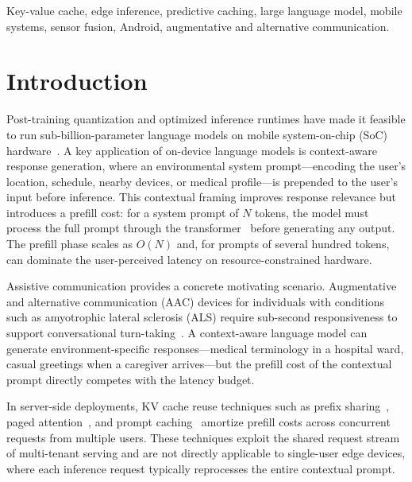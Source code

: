 \documentclass[journal]{IEEEtran}
\begin{document}
\begin{IEEEkeywords}
Key-value cache, edge inference, predictive caching, large language model, mobile systems, sensor fusion, Android, augmentative and alternative communication.
\end{IEEEkeywords}

\section{Introduction}
\label{sec:introduction}

Post-training quantization and optimized inference runtimes have made it feasible to run sub-billion-parameter language models on mobile system-on-chip (SoC) hardware~\cite{dettmers2022,frantar2022,llamacpp}. A key application of on-device language models is context-aware response generation, where an environmental system prompt---encoding the user's location, schedule, nearby devices, or medical profile---is prepended to the user's input before inference. This contextual framing improves response relevance but introduces a prefill cost: for a system prompt of $N$ tokens, the model must process the full prompt through the transformer~\cite{vaswani2017} before generating any output. The prefill phase scales as $O(N)$ and, for prompts of several hundred tokens, can dominate the user-perceived latency on resource-constrained hardware.

Assistive communication provides a concrete motivating scenario. Augmentative and alternative communication (AAC) devices for individuals with conditions such as amyotrophic lateral sclerosis (ALS) require sub-second responsiveness to support conversational turn-taking~\cite{beukelman2020}. A context-aware language model can generate environment-specific responses---medical terminology in a hospital ward, casual greetings when a caregiver arrives---but the prefill cost of the contextual prompt directly competes with the latency budget.

In server-side deployments, KV cache reuse techniques such as prefix sharing~\cite{sglang}, paged attention~\cite{vllm}, and prompt caching~\cite{cachegen} amortize prefill costs across concurrent requests from multiple users. These techniques exploit the shared request stream of multi-tenant serving and are not directly applicable to single-user edge devices, where each inference request typically reprocesses the entire contextual prompt.
\end{document}
